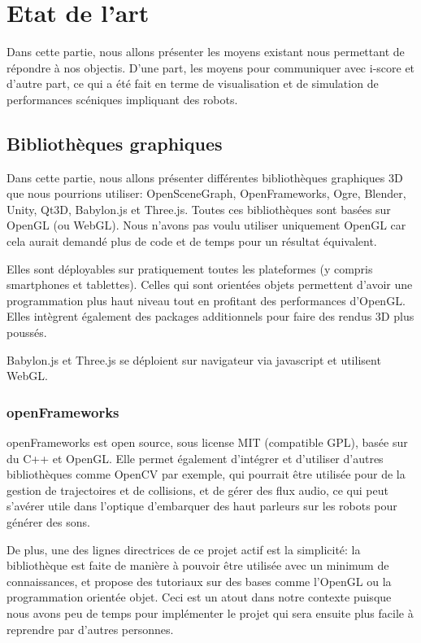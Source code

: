 \section{Etat de l'art}

Dans cette partie, nous allons présenter les moyens existant nous permettant de répondre à nos objectis. D'une part, les moyens pour communiquer avec i-score et d'autre part, ce qui a été fait en terme de visualisation et de simulation de performances scéniques impliquant des robots.

\subsection{Bibliothèques graphiques}
Dans cette partie, nous allons présenter différentes bibliothèques graphiques 3D que nous pourrions utiliser: OpenSceneGraph, OpenFrameworks, Ogre, Blender, Unity, Qt3D, Babylon.js et Three.js. Toutes ces bibliothèques sont basées sur OpenGL (ou WebGL). Nous n'avons pas voulu utiliser uniquement OpenGL car cela aurait demandé plus de code et de temps pour un résultat équivalent. 

Elles sont déployables sur pratiquement toutes les plateformes (y compris smartphones et tablettes). Celles qui sont orientées objets permettent d'avoir une programmation plus haut niveau tout en profitant des performances d'OpenGL. Elles intègrent également des packages additionnels pour faire des rendus 3D plus poussés. 

Babylon.js et Three.js se déploient sur navigateur via javascript et utilisent WebGL.


\subsubsection{openFrameworks}

openFrameworks est open source, sous license MIT (compatible GPL), basée sur du C++ et OpenGL. Elle permet également d'intégrer et d'utiliser d'autres bibliothèques comme OpenCV par exemple, qui pourrait être utilisée pour de la gestion de trajectoires et de collisions, et de gérer des flux audio, ce qui peut s'avérer utile dans l'optique d'embarquer des haut parleurs sur les robots pour générer des sons. 

De plus, une des lignes directrices de ce projet actif est la simplicité: la bibliothèque est faite de manière à pouvoir être utilisée avec un minimum de connaissances, et propose des tutoriaux sur des bases comme l'OpenGL ou la programmation orientée objet. Ceci est un atout dans notre contexte puisque nous avons peu de temps pour implémenter le projet qui sera ensuite plus facile à reprendre par d'autres personnes.

